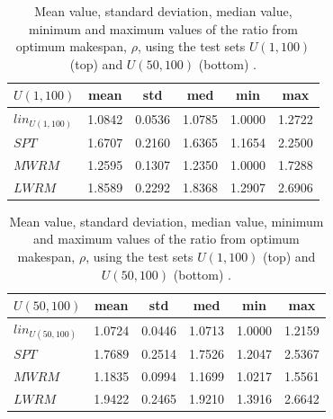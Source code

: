 \documentclass[10pt]{llncs}
\begin{document}
\begin{table}[t!]
 {\footnotesize
 \begin{center}
  \begin{tabular}{|p{1.5cm}|ccccc|}
   \hline\hline
   $U(1,100)$ & mean& std    & med    & min    & max   \\ \hline
   $lin_{U(1,100)}$ & 1.0842 & 0.0536 & 1.0785 & 1.0000 & 1.2722\\
   $SPT$     & 1.6707 & 0.2160 & 1.6365 & 1.1654 & 2.2500\\
   $MWRM$    & 1.2595 & 0.1307 & 1.2350 & 1.0000 & 1.7288\\
   $LWRM$    & 1.8589 & 0.2292 & 1.8368 & 1.2907 & 2.6906\\  
   \hline\hline
  \end{tabular}
  \begin{tabular}{|p{1.5cm}|ccccc|}
   \hline\hline
   $U(50,100)$ & mean   & std    & med    & min    & max    \\ \hline
   $lin_{U(50,100)}$    & 1.0724 & 0.0446 & 1.0713 & 1.0000 & 1.2159 \\
   $SPT$         & 1.7689 & 0.2514 & 1.7526 & 1.2047 & 2.5367 \\ 
   $MWRM$        & 1.1835 & 0.0994 & 1.1699 & 1.0217 & 1.5561 \\
   $LWRM$        & 1.9422 & 0.2465 & 1.9210 & 1.3916 & 2.6642 \\ 
   \hline\hline
  \end{tabular}
 \end{center}}
 \caption{Mean value, standard deviation, median value, minimum and maximum values of the ratio from optimum makespan, $\rho$, using the test sets $U(1,100)$ (top) and $U(50,100)$ (bottom) .}
 \label{tbl:stats}
\end{table}
\end{document}
